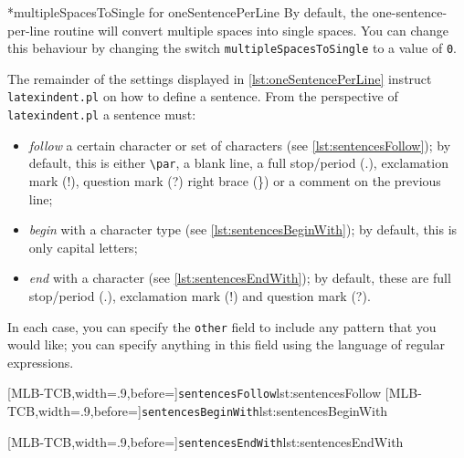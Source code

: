  *{multipleSpacesToSingle for oneSentencePerLine} By default, the
 one-sentence-per-line routine will convert multiple spaces into single spaces. You can
 change this behaviour by changing the switch \texttt{multipleSpacesToSingle} to a value
 of \texttt{0}.

 The remainder of the settings displayed in \vref{lst:oneSentencePerLine} instruct
 \texttt{latexindent.pl} on how to define a sentence. From the perspective of
 \texttt{latexindent.pl} a sentence must:   
 \begin{itemize}
  \item \emph{follow} a certain character or set of characters (see
        \cref{lst:sentencesFollow}); by default, this is either \lstinline!\par!, a
        blank line, a full stop/period (.), exclamation mark (!), question mark (?) right brace
        (\}) or a comment on the previous line;
  \item \emph{begin} with a character type (see \cref{lst:sentencesBeginWith}); by
        default, this is only capital letters;
  \item \emph{end} with a character (see \cref{lst:sentencesEndWith}); by
        default, these are full stop/period (.), exclamation mark (!) and question mark (?).
 \end{itemize}
 In each case, you can specify the \texttt{other} field to include any pattern that you
 would like; you can specify anything in this field using the language of regular
 expressions.  

 \begin{cmhtcbraster}[raster columns=2,
   raster left skip=-3.5cm,
   raster right skip=-2cm,
   raster column skip=.06\linewidth]
  [MLB-TCB,width=.9\linewidth,before=\centering]{\texttt{sentencesFollow}}{lst:sentencesFollow}
  [MLB-TCB,width=.9\linewidth,before=\centering]{\texttt{sentencesBeginWith}}{lst:sentencesBeginWith}
 \end{cmhtcbraster}

 [MLB-TCB,width=.9\linewidth,before=\centering]{\texttt{sentencesEndWith}}{lst:sentencesEndWith}

